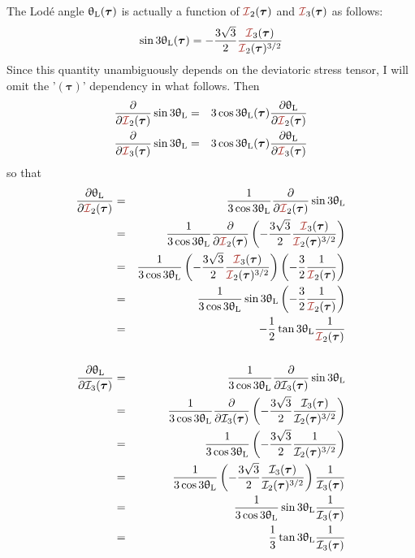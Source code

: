 The Lod\'e angle $\uptheta_{\rm L}(\bm\tau)$ 
is actually a function of ${\III}_2(\bm\tau)$ and ${\III}_3(\bm\tau)$ as follows:
\[
\sin 3\uptheta_{\rm L}(\bm\tau) = 
-\frac{3\sqrt{3}}{2}  \frac{{\III}_3(\bm\tau)}{{\III}_2(\bm\tau)^{3/2}} 
\]
Since this quantity unambiguously depends on the deviatoric stress tensor, 
I will omit the '$(\bm\tau)$' dependency in what follows.
Then
\begin{eqnarray}
\frac{\partial }{\partial {\III}_2(\bm\tau)} \sin 3\uptheta_{\rm L}
&=&3\cos 3\uptheta_{\rm L}(\bm\tau)  \frac{\partial \uptheta_{\rm L}}{\partial {\III}_2(\bm\tau)}\nn\\
\frac{\partial }{\partial {\III}_3(\bm\tau)} \sin 3\uptheta_{\rm L}
&=&3 \cos 3\uptheta_{\rm L}(\bm\tau)  \frac{\partial \uptheta_{\rm L}}{\partial {\III}_3(\bm\tau)}\nn
\end{eqnarray}
so that 
\begin{eqnarray}
\frac{\partial \uptheta_{\rm L}}{\partial {\III}_2(\bm\tau)}
&=&\frac{1}{3 \cos 3\uptheta_{\rm L}} 
\frac{\partial }{\partial {\III}_2(\bm\tau)} \sin 3\uptheta_{\rm L}  \nonumber\\
&=&\frac{1}{3 \cos 3\uptheta_{\rm L}} 
\frac{\partial }{\partial {\III}_2(\bm\tau)}
\left(-\frac{3\sqrt{3}}{2}  \frac{{\III}_3(\bm\tau)}{{\III}_2(\bm\tau)^{3/2}} \right) \nonumber\\
&=&\frac{1}{3 \cos 3\uptheta_{\rm L}} 
\left(-\frac{3\sqrt{3}}{2}  \frac{{\III}_3(\bm\tau)}{{\III}_2(\bm\tau)^{3/2}} \right)
\left( -\frac32 \frac{1}{ {\III}_2(\bm\tau)}\right) \nonumber\\
&=&\frac{1}{3 \cos 3\uptheta_{\rm L}} 
\sin 3\uptheta_{\rm L}
\left( -\frac32 \frac{1}{ {\III}_2(\bm\tau)}\right) \nonumber\\
&=& -\frac12 \tan 3\uptheta_{\rm L} \frac{1}{ {\III}_2(\bm\tau)}  
\nn\\
\nn\\
\frac{\partial \uptheta_{\rm L}}{\partial {\cal I}_3(\bm\tau)}
&=&\frac{1}{3 \cos 3\uptheta_{\rm L}} 
\frac{\partial }{\partial {\cal I}_3(\bm\tau)} \sin 3\uptheta_{\rm L} \nonumber \\
&=&\frac{1}{3 \cos 3\uptheta_{\rm L}} 
\frac{\partial }{\partial {\cal I}_3(\bm\tau)} 
\left(
-\frac{3\sqrt{3}}{2}  \frac{{\cal I}_3(\bm\tau)}{{\cal I}_2(\bm\tau)^{3/2}} 
\right) \nonumber\\
&=&\frac{1}{3 \cos 3\uptheta_{\rm L}} 
\left(
-\frac{3\sqrt{3}}{2}  \frac{1}{ {\cal I}_2(\bm\tau)^{3/2}} 
\right) \nonumber\\
&=&\frac{1}{3 \cos 3\uptheta_{\rm L}} 
\left(
-\frac{3\sqrt{3}}{2}  \frac{{\cal I}_3(\bm\tau)}{{\cal I}_2(\bm\tau)^{3/2}} 
\right)
\frac{1}{{\cal I}_3(\bm\tau)} \nn\\
&=&\frac{1}{3 \cos 3\uptheta_{\rm L}} 
\sin 3 \uptheta_{\rm L}
\frac{1}{{\cal I}_3(\bm\tau)}\nn \\
&=& \frac13 \tan 3\uptheta_{\rm L} \frac{1}{{\cal I}_3(\bm\tau)} \nn
\end{eqnarray}
